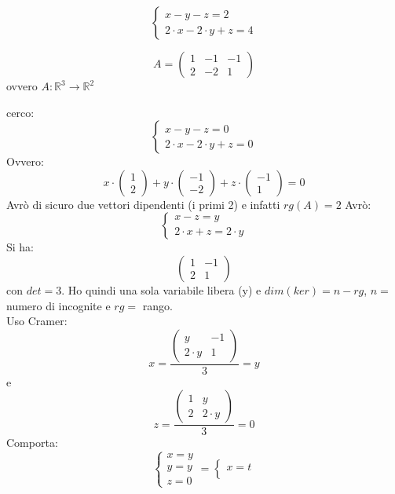 \documentclass[a4paper,12pt, oneside]{book}
\begin{document}
\begin{esempio}
$$\begin{cases}
x-y-z=2\\
2\cdot x-2\cdot y +z =4
\end{cases}$$

$$
A=\left(\begin{matrix}
1  & -1 & -1\\
2 & -2 & 1
\end{matrix}\right)
$$
ovvero $A:\mathbb{R}^3\rightarrow \mathbb{R}^2$

cerco:
$$\begin{cases}
x-y-z=0\\
2\cdot x-2\cdot y +z =0
\end{cases}$$
Ovvero:
$$
x\cdot\left(\begin{matrix}
1\\
2
\end{matrix}\right)+y\cdot\left(\begin{matrix}
-1\\
-2
\end{matrix}\right)+z\cdot\left(\begin{matrix}
-1\\
1
\end{matrix}\right)=0
$$
Avrò di sicuro due vettori dipendenti (i primi 2) e infatti $rg(A)=2$
Avrò:
$$\begin{cases}
x-z=y\\
2\cdot x+z=2\cdot y
\end{cases}
$$
\newpage
Si ha:
$$
\left(\begin{matrix}
1 & -1\\
2 & 1
\end{matrix}\right)
$$
con $det=3$. Ho quindi una sola variabile libera (y) e $dim(ker)=n-rg$, $n=$ numero di incognite e $rg=$ rango.\\
Uso Cramer:
$$
x=\frac{\left(\begin{matrix}
y & -1\\
2\cdot y & 1
\end{matrix}\right)}{3}=y
$$
e 
$$
z=\frac{\left(\begin{matrix}
1 & y\\
2 & 2\cdot y
\end{matrix}\right)}{3}=0
$$
Comporta:
$$\begin{cases}
x=y\\
y=y\\
z=0
\end{cases}=\begin{cases}
x=t\\

\end{cases}$$
\end{esempio}
\end{document}
